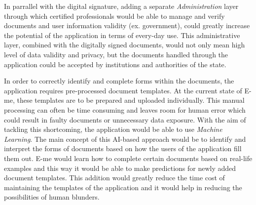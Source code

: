 In parrallel with the digital signature, adding a separate \emph{Administration} layer through which certified professionals
 would be able to manage and verify documents and user information validity (ex. government), could
greatly increase the potential of the application in terms of every-day use.
This administrative layer, combined with the digitally signed documents, would not only mean high level of data validity and privacy, but the documents handled
through the application could be accepted by institutions and authorities of the state.

In order to correctly identify and complete forms within the documents, the application requires pre-processed document templates.
At the current state of E-me, these templates are to be prepared and uploaded individually.
This manual processing can often be time consuming and leaves room for human error which could result in faulty documents or unnecessary data exposure.
With the aim of tackling this shortcoming, the application would be able to use \emph{Machine Learning}.
The main concept of this AI-based approach would be to identify and interpret the forms of documents based on how the users of the application fill them out.
E-me would learn how to complete certain documents based on real-life examples and this way it would be able to make predictions for newly added document templates.
This addition would greatly reduce the time cost of maintaining the templates of the application and it would help in reducing the possibilities of human blunders.